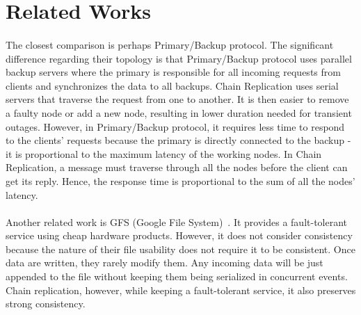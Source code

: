\section{Related Works}
\setcounter{subsection}{0}
\renewcommand*{\thesubsection}{\Alph{subsection}.}

\paragraph{}
The closest comparison is perhaps Primary/Backup protocol. The significant difference regarding their topology is that Primary/Backup protocol uses parallel backup servers where the primary is responsible for all incoming requests from clients and synchronizes the data to all backups. 
Chain Replication uses serial servers that traverse the request from one to another. It is then easier to remove a faulty node or add a new node, resulting in lower duration needed for transient outages. However, in Primary/Backup protocol, it requires less time to respond to the clients' requests because the primary is directly connected to the backup - it is proportional to the maximum latency of the working nodes. In Chain Replication, a message must traverse through all the nodes before the client can get its reply. Hence, the response time is proportional to the sum of all the nodes' latency.

\paragraph{}
Another related work is GFS (Google File System)~\cite{ghemawat2003google}. It provides a fault-tolerant service using cheap hardware products. However, it does not consider consistency because the nature of their file usability does not require it to be consistent. Once data are written, they rarely modify them. Any incoming data will be just appended to the file without keeping them being serialized in concurrent events. Chain replication, however, while keeping a fault-tolerant service, it also preserves strong consistency.

